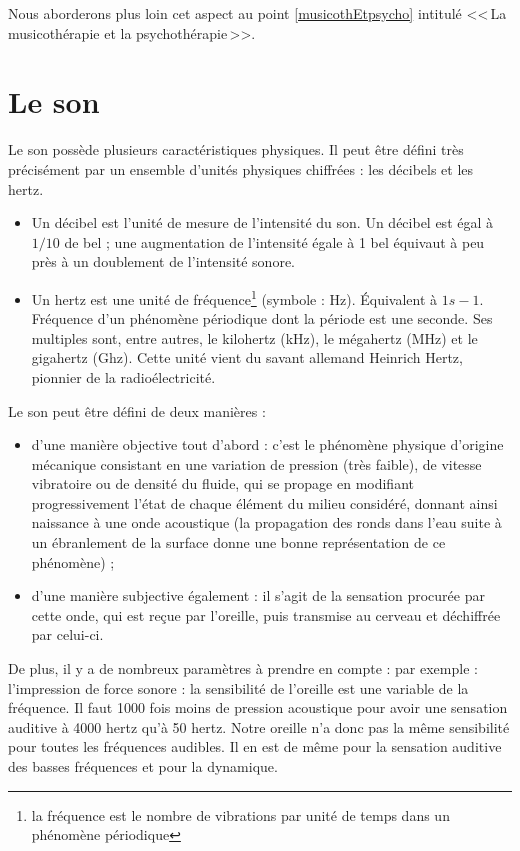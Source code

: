  Nous aborderons plus loin cet aspect au point \ref{musicothEtpsycho} intitulé <<\,La musicothérapie et la psychothérapie\,>>.


\section{Le son}

Le son possède plusieurs caractéristiques physiques. Il peut être
défini très précisément par un ensemble d'unités physiques chiffrées
: les décibels et les hertz. 
\begin{itemize}
	\item Un décibel est l'unité de mesure de l'intensité du son. Un décibel
	est égal à $1/10$ de bel ; une augmentation de l'intensité égale à 1
	bel équivaut à peu près à un doublement de l'intensité sonore. 
	\item Un hertz est une unité de fréquence\footnote{la fréquence est le nombre de vibrations par unité de temps dans un
		phénomène périodique} (symbole : Hz). Équivalent à $1s-1$. Fréquence d'un phénomène périodique
	dont la période est une seconde. Ses multiples sont, entre autres,
	le kilohertz (kHz), le mégahertz (MHz) et le gigahertz (Ghz). Cette
	unité vient du savant allemand Heinrich Hertz, pionnier de la radioélectricité.
\end{itemize}
Le son peut être défini de deux manières : 
\begin{itemize}
	\item d'une manière objective tout d'abord : c'est le phénomène phy\-si\-que
	d'origine mécanique consistant en une variation de pression (très
	faible), de vitesse vibratoire ou de densité du fluide, qui se propage
	en modifiant progressivement l'état de chaque élément du milieu considéré,
	donnant ainsi naissance à une onde acoustique (la propagation des
	ronds dans l'eau suite à un ébranlement de la surface donne une bonne
	représentation de ce phénomène) ; 
	\item d'une manière subjective également : il s'agit de la sensation procurée
	par cette onde, qui est reçue par l'oreille, puis transmise au cerveau
	et déchiffrée par celui-ci.
\end{itemize}
De plus, il y a de nombreux paramètres à prendre en compte : par
exemple : l'impression de force sonore : la sensibilité de l'oreille
est une variable de la fréquence. Il faut 1000 fois moins de pression
acoustique pour avoir une sensation auditive à 4000 hertz qu'à 50
hertz. Notre oreille n'a donc pas la même sensibilité pour toutes
les fréquences audibles. Il en est de même pour la sensation auditive
des basses fréquences et pour la dynamique. 





